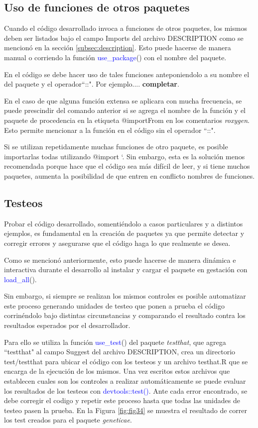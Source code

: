 \subsection{Uso de funciones de otros paquetes}
Cuando el código desarrollado invoca a funciones de otros paquetes, los mismos deben ser listados bajo el campo Imports del archivo DESCRIPTION como se mencionó en la sección \ref{subsec:description}. Esto puede hacerse de manera manual o corriendo la función \textcolor{blue}{use\_package}() con el nombre del paquete.

En el código se debe hacer uso de tales funciones anteponiendolo a su nombre el del paquete y el operador``::". Por ejemplo.... \textbf{completar}.

En el caso de que alguna función extensa se aplicara con mucha frecuencia, se puede prescindir del comando anterior si se agrega el nombre de la función y el paquete de procedencia en la etiqueta @importFrom en los comentarios \emph{roxygen}. Esto permite mencionar a la función en el código sin el operador ``::".

Si se utilizan repetidamente muchas funciones de otro paquete, es posible importarlas todas utilizando @import `. Sin embargo, esta es la solución menos recomendada porque hace que el código sea más difícil de leer, y si tiene muchos paquetes, aumenta la posibilidad de que entren en conflicto nombres de funciones.

\subsection{Testeos}

Probar el código desarrollado, somentiéndolo a casos particulares y a distintos ejemplos, es fundamental en la creación de paquetes ya que permite detectar y corregir errores y asegurarse que el código haga lo que realmente se desea.

Como se mencionó anteriormente, esto puede hacerse de manera dinámica e interactiva durante el desarrollo al instalar y cargar el paquete en gestación con \textcolor{blue}{load\_all}().

Sin embargo, si siempre se realizan los mismos controles es posible automatizar este proceso generando unidades de testeo que ponen a prueba el código corrinéndolo bajo distintas circunstancias y comparando el resultado contra los resultados esperados por el desarrollador.


Para ello se utiliza la función \textcolor{blue}{use\_test}() del paquete \emph{testthat}, que agrega ``testthat" al campo Suggest del archivo DESCRIPTION, crea un directorio test/testthat para ubicar el código con los testeos y un archivo testhat.R que se encarga de la ejecución de los mismos. Una vez escritos estos archivos que establecen cuales son los controles a realizar automáticamente se puede evaluar los resultados de los testeos con \textcolor{blue}{devtools::test()}. Ante cada error encontrado, se debe corregir el codigo y repetir este proceso hasta que todas las unidades de testeo pasen la prueba. En la Figura \ref{fig:fig34} se muestra el resultado de correr los test creados para el paquete \emph{geneticae}.


